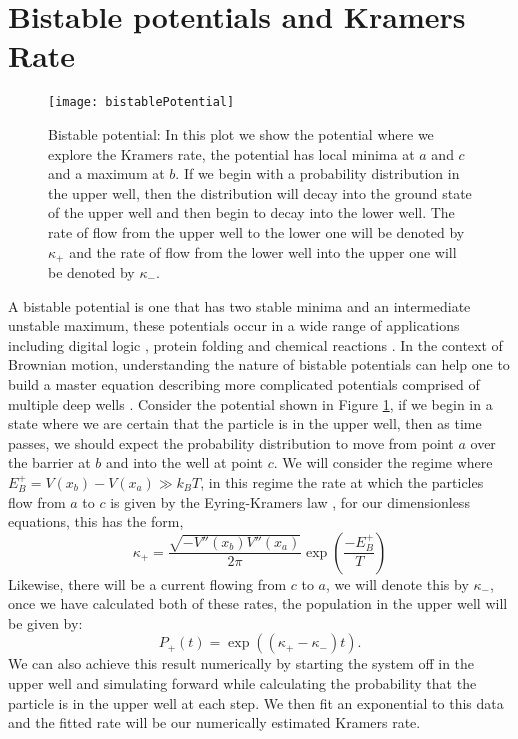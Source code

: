 \section{Bistable potentials and Kramers Rate}

\begin{figure}[tb]
\texttt{[image: bistablePotential]}
\caption{Bistable potential: In this plot we show the potential where we explore the Kramers rate, the potential has local minima at $a$ and $c$ and a maximum at $b$. If we begin with a probability distribution in the upper well, then the distribution will decay into the ground state of the upper well and then begin to decay into the lower well. The rate of flow from the upper well to the lower one will be denoted by $\kappa_+$ and the rate of flow from the lower well into the upper one will be denoted by $\kappa_-$.}
\label{fig:bistablePotential}
\end{figure}

A bistable potential is one that has two stable minima and an intermediate unstable maximum, these potentials occur in a wide range of applications including digital logic \cite{MyersCelebranoKrishnan2015}, protein folding \cite{BryngelsonWolynes1989} and chemical reactions \cite{BernePecora1976}. In the context of Brownian motion, understanding the nature of bistable potentials can help one to build a master equation describing more complicated potentials comprised of multiple deep wells \cite{Barcilon1996, ChallisJack2014}. Consider the potential shown in Figure \ref{fig:bistablePotential}, if we begin in a state where we are certain that the particle is in the upper well, then as time passes, we should expect the probability distribution to move from point $a$ over the barrier at $b$ and into the well at point $c$. We will consider the regime where $E^+_B = V(x_b) - V(x_a) \gg k_B T$, in this regime the rate at which the particles flow from $a$ to $c$ is given by the Eyring-Kramers law \cite{Eyring1935, Kramers1940}, for our dimensionless equations, this has the form,
\begin{equation}
\kappa_+ = \frac{\sqrt{-V''(x_b) V''(x_a)}}{2 \pi} \exp \left({\frac{-E^+_B}{T}} \right)
\end{equation}
Likewise, there will be a current flowing from $c$ to $a$, we will denote this by $\kappa_-$, once we have calculated both of these rates, the population in the upper well will be given by:
\begin{equation}
P_+(t) = \exp{((\kappa_+ - \kappa_- )t)}.
\end{equation}
We can also achieve this result numerically by starting the system off in the upper well and simulating forward while calculating the probability that the particle is in the upper well at each step. We then fit an exponential to this data and the fitted rate will be our numerically estimated Kramers rate.